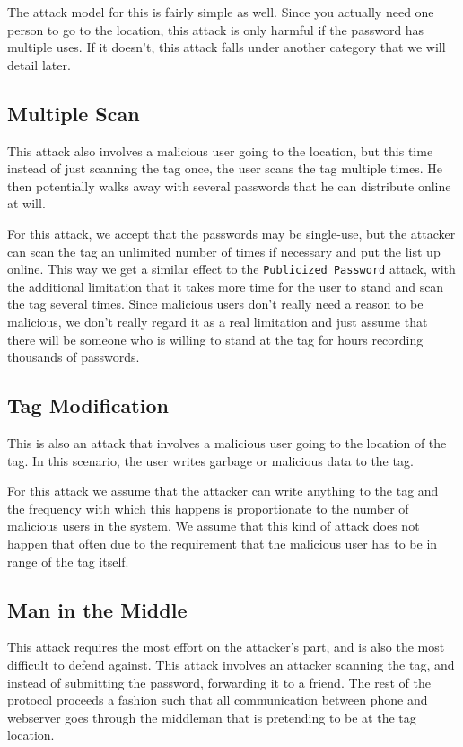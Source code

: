 \documentclass{sig-alternate}
\begin{document}
The attack model for this is fairly simple as well. Since you actually
need one person to go to the location, this attack is only harmful if
the password has multiple uses. If it doesn't, this attack falls under
another category that we will detail later.

\subsection{Multiple Scan}
This attack also involves a malicious user going to the location, but
this time instead of just scanning the tag once, the user scans the
tag multiple times. He then potentially walks away with several
passwords that he can distribute online at will.

For this attack, we accept that the passwords may be single-use, but
the attacker can scan the tag an unlimited number of times if
necessary and put the list up online. This way we get a similar effect
to the \texttt{Publicized Password} attack, with the additional
limitation that it takes more time for the user to stand and scan the
tag several times. Since malicious users don't really need a reason to
be malicious, we don't really regard it as a real limitation and just
assume that there will be someone who is willing to stand at the tag
for hours recording thousands of passwords.

\subsection{Tag Modification}
This is also an attack that involves a malicious user going to the
location of the tag. In this scenario, the user writes garbage or
malicious data to the tag. 

For this attack we assume that the attacker can write anything to the
tag and the frequency with which this happens is proportionate to the
number of malicious users in the system. We assume that this kind of
attack does not happen that often due to the requirement that the
malicious user has to be in range of the tag itself.

\subsection{Man in the Middle}
This attack requires the most effort on the attacker's part, and is
also the most difficult to defend against. This attack involves an
attacker scanning the tag, and instead of submitting the password,
forwarding it to a friend. The rest of the protocol proceeds a fashion
such that all communication between phone and webserver goes through
the middleman that is pretending to be at the tag location.
\end{document}
